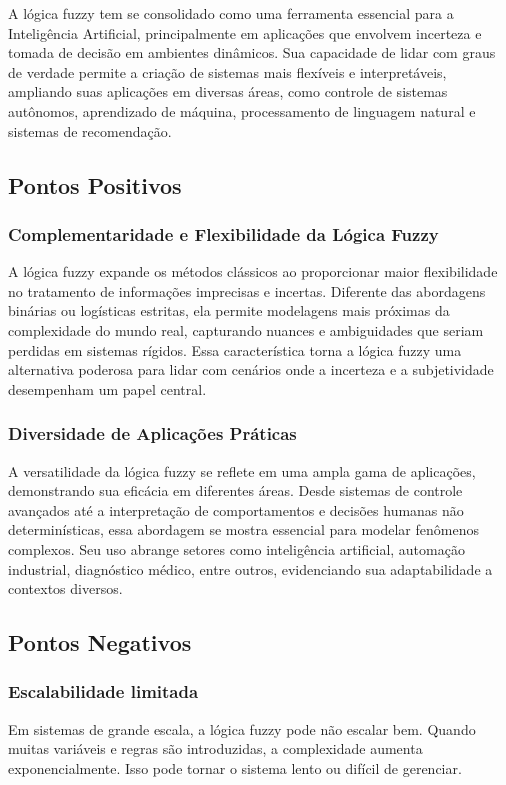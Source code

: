 \documentclass[12pt]{article}
\begin{document}
A lógica fuzzy tem se consolidado como uma ferramenta essencial para a Inteligência Artificial, principalmente em aplicações que envolvem incerteza e tomada de decisão em ambientes dinâmicos. Sua capacidade de lidar com graus de verdade permite a criação de sistemas mais flexíveis e interpretáveis, ampliando suas aplicações em diversas áreas, como controle de sistemas autônomos, aprendizado de máquina, processamento de linguagem natural e sistemas de recomendação.

\subsection{Pontos Positivos}
\subsubsection{Complementaridade e Flexibilidade da Lógica Fuzzy}
A lógica fuzzy expande os métodos clássicos ao proporcionar maior flexibilidade no tratamento de informações imprecisas e incertas.\cite{book} Diferente das abordagens binárias ou logísticas estritas, ela permite modelagens mais próximas da complexidade do mundo real, capturando nuances e ambiguidades que seriam perdidas em sistemas rígidos. Essa característica torna a lógica fuzzy uma alternativa poderosa para lidar com cenários onde a incerteza e a subjetividade desempenham um papel central.
\subsubsection{Diversidade de Aplicações Práticas}
A versatilidade da lógica fuzzy se reflete em uma ampla gama de aplicações, demonstrando sua eficácia em diferentes áreas. Desde sistemas de controle avançados até a interpretação de comportamentos e decisões humanas não determinísticas, essa abordagem se mostra essencial para modelar fenômenos complexos. Seu uso abrange setores como inteligência artificial, automação industrial, diagnóstico médico, entre outros, evidenciando sua adaptabilidade a contextos diversos.

\subsection{Pontos Negativos}

\subsubsection{Escalabilidade limitada}
Em sistemas de grande escala, a lógica fuzzy pode não escalar bem. Quando muitas variáveis e regras são introduzidas, a complexidade aumenta exponencialmente. Isso pode tornar o sistema lento ou difícil de gerenciar.
\end{document}
